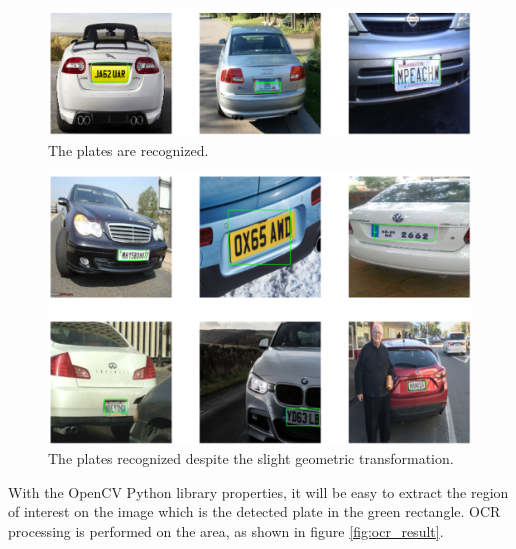 \documentclass[lnbip]{svmultln}
\begin{document}
	
	
	\begin{figure}[H]%
		\centering
		\includegraphics[width=\textwidth]{images/predicted_trans_image_2}
		\caption{The plates are recognized.}
		\label{fig:predicted_trans_image_2}
	\end{figure}

	\begin{figure}[H]%
		\centering
		\includegraphics[width=\textwidth]{images/predicted_trans_image_1}
		\caption{The plates recognized despite the slight geometric transformation.}
		\label{fig:predicted_trans_image_1}
	\end{figure}

	With the OpenCV Python library properties, it will be easy to extract the region of interest on the image which is the detected plate in the green rectangle. OCR processing is performed on the area, as shown in figure \ref{fig:ocr_result}.
\end{document}
